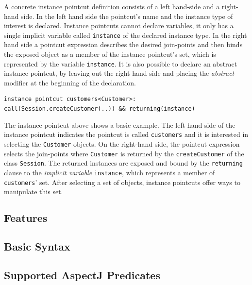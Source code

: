 \documentclass{llncs}
\begin{document}
A concrete instance pointcut definition consists of a left hand-side and a right-hand side. In the left hand side the pointcut's name and the instance type of interest is declared. Instance pointcuts cannot declare variables, it only has a single implicit variable called \texttt{instance} of the declared instance type. In the right hand side a pointcut expression describes the desired join-points and then binds the exposed object as a member of the instance pointcut's set, which is represented by the variable \texttt{instance}.  It is also possible to declare an abstract instance pointcut, by leaving out the right hand side and placing the \emph{abstract} modifier at the beginning of the declaration.
\begin{lstlisting}[float=h!]
instance pointcut customers<Customer>: call(Session.createCustomer(..)) && returning(instance)
\end{lstlisting}

The instance pointcut above shows a basic example. The left-hand side of the instance pointcut indicates the pointcut is called \texttt{customers} and it is interested in selecting the \texttt{Customer} objects. On the right-hand side, the pointcut expression selects the join-points where \texttt{Customer} is returned by the \texttt{createCustomer} of the class \texttt{Session}. The returned instances are exposed and bound by the \texttt{returning} clause to the \emph{implicit variable} \texttt{instance}, which represents a member of \texttt{customers}' set. After selecting a set of objects, instance pointcuts offer ways to manipulate this set. 



\subsection{Features}

\subsection{Basic Syntax}

\subsection{Supported AspectJ Predicates}
\end{document}
